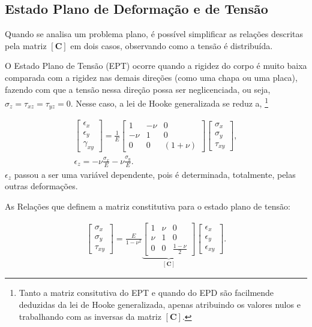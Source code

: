 \subsection{Estado Plano de Deformação e de Tensão}

Quando se analisa um problema plano, é possível simplificar as relações descritas pela matriz $[\bm{C}]$ em dois casos, observando como a tensão é distribuída.

O Estado Plano de Tensão (EPT) ocorre quando a rigidez do corpo é muito baixa comparada com a rigidez nas demais direções (como uma chapa ou uma placa), fazendo com que a tensão nessa direção possa ser neglicenciada, ou seja, $\sigma_z = \tau_{xz} = \tau_{yz} = 0$. Nesse caso, a lei de Hooke generalizada se reduz a, \footnote{Tanto a matriz consitutiva do EPT e quando do EPD são facilmende deduzidas da lei de Hooke generalizada, apenas atribuindo os valores nulos e trabalhando com as inversas da matriz $[\bm{C}]$.}

\begin{gather}
    \begin{bmatrix}
        \epsilon_x \\
        \epsilon_y \\
        \gamma_{xy}
    \end{bmatrix} = \frac{1}{E} \begin{bmatrix}
        1 & -\nu & 0 \\
        -\nu & 1 & 0 \\
        0 & 0 & (1+\nu)
    \end{bmatrix}
    \begin{bmatrix}
        \sigma_x \\
        \sigma_y \\
        \tau_{xy}
    \end{bmatrix}, \\
    \epsilon_z = -\nu \frac{\sigma_x}{E} - \nu \frac{\sigma_y}{E}.
\end{gather}
$\epsilon_z$ passou a ser uma variável dependente, pois é determinada, totalmente, pelas outras deformações. \cite[pág. 90]{Zin}

As Relações que definem a matriz constitutiva para o estado plano de tensão:

\begin{gather}
    \begin{bmatrix}
        \sigma_x \\
        \sigma_y \\
        \tau_{xy}
    \end{bmatrix} = \frac{E}{1-\nu^2} 
    \underbrace{\begin{bmatrix}
        1 & \nu & 0 \\
        \nu & 1 & 0 \\
        0 & 0 & \frac{1-\nu}{2}
    \end{bmatrix}}_{[\bm{C}]}
    \begin{bmatrix}
        \epsilon_x \\
        \epsilon_y \\
        \epsilon_{xy}
    \end{bmatrix}.
\end{gather}


